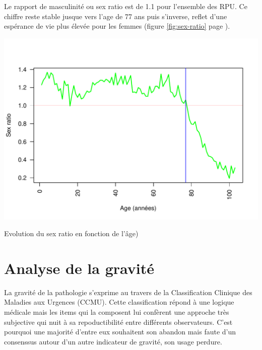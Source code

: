 \documentclass[12pt,english,french,twoside]{book}\usepackage[]{graphicx}\usepackage[]{color}
\makeatletter
\def\maxwidth{ %
  \ifdim\Gin@nat@width>\linewidth
    \linewidth
  \else
    \Gin@nat@width
  \fi
}
\newenvironment{knitrout}{}{} %
\makeatother
\begin{document}
Le rapport de masculinité ou sex ratio est de 1.1 pour l'ensemble des RPU. Ce chiffre reste stable jusque vers l'age de 77 ans puis s'inverse, reflet d'une espérance de vie plus élevée pour les femmes (figure \ref{fig:sex-ratio} page \pageref{fig:sex-ratio}).

\begin{center}
\begin{knitrout}
\color{fgcolor}
\includegraphics[width=\maxwidth]{figure/sr_graphe-1} 

\end{knitrout}
\caption{Evolution du sex ratio en fonction de l'âge)}
\label{fig:sex-ratio}
\end{center}



\newpage
\chapter{Analyse de la gravité}



La gravité de la pathologie s'exprime au travers de la Classification Clinique des Maladies aux Urgences (CCMU). Cette classification répond à une logique médicale mais les items qui la composent lui confèrent une approche très subjective qui nuit à sa repoductibilité entre différents observateurs. C'est pourquoi une majorité d'entre eux souhaitent son abandon mais  faute d'un consenssus autour d'un autre indicateur de gravité, son usage perdure.
\end{document}
